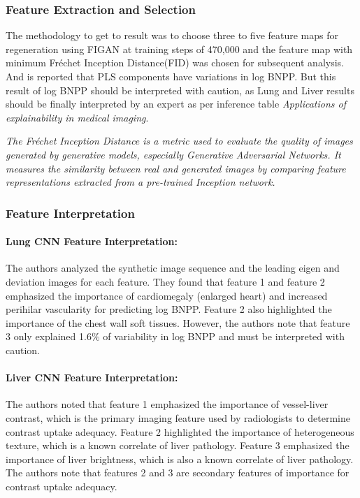 \subsubsection{Feature Extraction and Selection}

\noindent
The methodology to get to result was to choose three to five feature maps for regeneration using FIGAN at training steps of 470,000 and the feature map with minimum Fréchet Inception Distance(FID) was chosen for subsequent analysis. And is reported that PLS components have variations in log BNPP. But this result of log BNPP should be interpreted with caution, as Lung and Liver results should be finally interpreted by an expert as per inference table \textit{Applications of explainability in medical imaging\cite{XAI}}.

\noindent
\textit{The Fréchet Inception Distance is a metric used to evaluate the quality of images generated by generative models, especially Generative Adversarial Networks. It measures the similarity between real and generated images by comparing feature representations extracted from a pre-trained Inception network.}

\clearpage

\subsubsection{Feature Interpretation}

\paragraph{Lung CNN Feature Interpretation:}

The authors analyzed the synthetic image sequence and the leading eigen and deviation images for each feature. They found that feature 1 and feature 2 emphasized the importance of cardiomegaly (enlarged heart) and increased perihilar vascularity for predicting log BNPP. Feature 2 also highlighted the importance of the chest wall soft tissues. However, the authors note that feature 3 only explained 1.6\% of variability in log BNPP and must be interpreted with caution.


\paragraph{Liver CNN Feature Interpretation:}

The authors noted that feature 1 emphasized the importance of vessel-liver contrast, which is the primary imaging feature used by radiologists to determine contrast uptake adequacy. Feature 2 highlighted the importance of heterogeneous texture, which is a known correlate of liver pathology. Feature 3 emphasized the importance of liver brightness, which is also a known correlate of liver pathology. The authors note that features 2 and 3 are secondary features of importance for contrast uptake adequacy.

